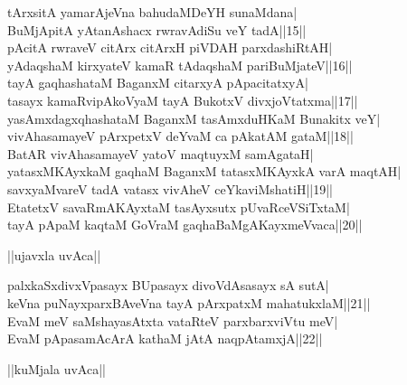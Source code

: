 \documentclass{article}
\begin{document}
tArxsitA yamarAjeVna bahudaMDeYH sunaMdana|\\
BuMjApitA yAtanAshacx rwravAdiSu veY tadA||15||\\
pAcitA rwraveV citArx citArxH piVDAH parxdashiRtAH|\\
yAdaqshaM kirxyateV kamaR tAdaqshaM pariBuMjateV||16||\\
tayA gaqhashataM BaganxM citarxyA pApacitatxyA|\\
tasayx kamaRvipAkoVyaM tayA BukotxV divxjoVtatxma||17||\\
yasAmxdagxqhashataM BaganxM tasAmxduHKaM Bunakitx veY|\\
vivAhasamayeV pArxpetxV deYvaM ca pAkatAM gataM||18||\\
BatAR vivAhasamayeV yatoV maqtuyxM samAgataH|\\
yatasxMKAyxkaM gaqhaM BaganxM tatasxMKAyxkA varA maqtAH|\\
savxyaMvareV tadA vatasx vivAheV ceYkaviMshatiH||19||\\
EtatetxV savaRmAKAyxtaM tasAyxsutx pUvaRceVSiTxtaM|\\
tayA pApaM kaqtaM GoVraM gaqhaBaMgAKayxmeVvaca||20||\\

\begin{center}
||ujavxla uvAca||
\end{center}

palxkaSxdivxVpasayx BUpasayx divoVdAsasayx sA sutA|\\
keVna puNayxparxBAveVna tayA pArxpatxM mahatukxlaM||21||\\
EvaM meV saMshayasAtxta vataRteV parxbarxviVtu meV|\\
EvaM pApasamAcArA kathaM jAtA naqpAtamxjA||22||\\

\begin{center}
||kuMjala uvAca||
\end{center}
\end{document}
